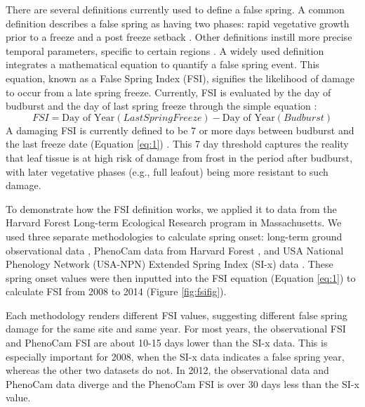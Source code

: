 \documentclass{article}\usepackage[]{graphicx}\usepackage[]{color}
\begin{document}
There are several definitions currently used to define a false spring. A common definition describes a false spring as having two phases: rapid vegetative growth prior to a freeze and a post freeze setback \citep{Gu2008}. Other definitions instill more precise temporal parameters, specific to certain regions \citep[e.g., in][false spring for the Midwestern United States is defined as a warmer than average March, a freezing April, and enough growing degree days between budburst and the last freeze date]{Augspurger2013}. A widely used definition integrates a mathematical equation to quantify a false spring event. This equation, known as a False Spring Index (FSI), signifies the likelihood of damage to occur from a late spring freeze. Currently, FSI is evaluated by the day of budburst and the day of last spring freeze through the simple equation \citep{Marino2011}:
\begin{equation} \label{eq:1}
FSI = \text{Day of Year} (Last Spring Freeze) - \text{Day of Year} (Budburst)
\end{equation}
A damaging FSI is currently defined to be 7 or more days between budburst and the last freeze date (Equation \ref{eq:1}) \citep{Peterson2014}. This 7 day threshold captures the reality that leaf tissue is at high risk of damage from frost in the period after budburst, with later vegetative phases (e.g., full leafout) being more resistant to such damage.%

To demonstrate how the FSI definition works, we applied it to data from the Harvard Forest Long-term Ecological Research program in Massachusetts. We used three separate methodologies to calculate spring onset: long-term ground observational data \citep{Okeefe2014}, PhenoCam data from Harvard Forest \citep{Richardson2015}, and USA National Phenology Network (USA-NPN) Extended Spring Index (SI-x) data \citep{USA-NPN2016}. These spring onset values were then inputted into the FSI equation (Equation \ref{eq:1}) to calculate FSI from 2008 to 2014 (Figure \ref{fig:fsifig}). 

Each methodology renders different FSI values, suggesting different false spring damage for the same site and same year. For most years, the observational FSI and PhenoCam FSI are about 10-15 days lower than the SI-x data. This is especially important for 2008, when the SI-x data indicates a false spring year, whereas the other two datasets do not. In 2012, the observational data and PhenoCam data diverge and the PhenoCam FSI is over 30 days less than the SI-x value.
\end{document}
